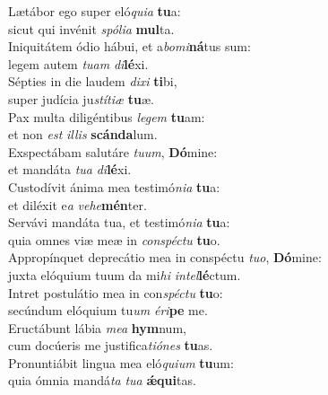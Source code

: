 \evenverse Lætábor ego super eló\textit{qui}\textit{a} \textbf{tu}a:~\*\\
\evenverse sicut qui invénit \textit{spó}\textit{li}\textit{a} \textbf{mul}ta.\\
\oddverse Iniquitátem ódio hábui, et a\textit{bo}\textit{mi}\textbf{ná}tus sum:~\*\\
\oddverse legem autem \textit{tu}\textit{am} \textit{di}\textbf{lé}xi.\\
\evenverse Sépties in die laudem \textit{di}\textit{xi} \textbf{ti}bi,~\*\\
\evenverse super judícia ju\textit{stí}\textit{ti}\textit{æ} \textbf{tu}æ.\\
\oddverse Pax multa diligéntibus \textit{le}\textit{gem} \textbf{tu}am:~\*\\
\oddverse et non \textit{est} \textit{il}\textit{lis} \textbf{scán}\textbf{da}lum.\\
\evenverse Exspectábam salutáre \textit{tu}\textit{um}, \textbf{Dó}mine:~\*\\
\evenverse et mandáta \textit{tu}\textit{a} \textit{di}\textbf{lé}xi.\\
\oddverse Custodívit ánima mea testimó\textit{ni}\textit{a} \textbf{tu}a:~\*\\
\oddverse et diléxit e\textit{a} \textit{ve}\textit{he}\textbf{mén}ter.\\
\evenverse Servávi mandáta tua, et testimó\textit{ni}\textit{a} \textbf{tu}a:~\*\\
\evenverse quia omnes viæ meæ in \textit{con}\textit{spé}\textit{ctu} \textbf{tu}o.\\
\oddverse Appropínquet deprecátio mea in conspéctu \textit{tu}\textit{o}, \textbf{Dó}mine:~\*\\
\oddverse juxta elóquium tuum da mi\textit{hi} \textit{in}\textit{tel}\textbf{lé}ctum.\\
\evenverse Intret postulátio mea in con\textit{spé}\textit{ctu} \textbf{tu}o:~\*\\
\evenverse secúndum elóquium tu\textit{um} \textit{é}\textit{ri}\textbf{pe} me.\\
\oddverse Eructábunt lábia \textit{me}\textit{a} \textbf{hym}num,~\*\\
\oddverse cum docúeris me justifica\textit{ti}\textit{ó}\textit{nes} \textbf{tu}as.\\
\evenverse Pronuntiábit lingua mea eló\textit{qui}\textit{um} \textbf{tu}um:~\*\\
\evenverse quia ómnia mandá\textit{ta} \textit{tu}\textit{a} \textbf{ǽ}\textbf{qui}tas.\\
